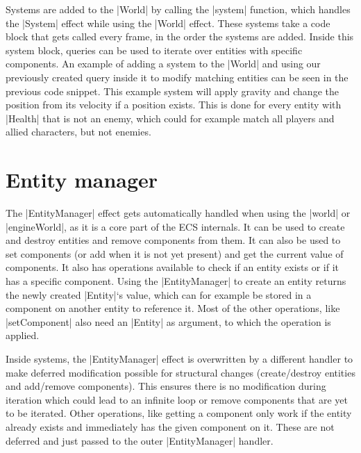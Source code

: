 Systems are added to the |World| by calling the |system| function, which handles the |System| effect while using the |World| effect. These systems take a code block that gets called every frame, in the order the systems are added. Inside this system block, queries can be used to iterate over entities with specific components. An example of adding a system to the |World| and using our previously created query inside it to modify matching entities can be seen in the previous code snippet. This example system will apply gravity and change the position from its velocity if a position exists. This is done for every entity with |Health| that is not an enemy, which could for example match all players and allied characters, but not enemies.

\section{Entity manager}

The |EntityManager| effect gets automatically handled when using the |world| or |engineWorld|, as it is a core part of the ECS internals. It can be used to create and destroy entities and remove components from them. It can also be used to set components (or add when it is not yet present) and get the current value of components. It also has operations available to check if an entity exists or if it has a specific component. Using the |EntityManager| to create an entity returns the newly created |Entity|`s value, which can for example be stored in a component on another entity to reference it. Most of the other operations, like |setComponent| also need an |Entity| as argument, to which the operation is applied.

Inside systems, the |EntityManager| effect is overwritten by a different handler to make deferred modification possible for structural changes (create/destroy entities and add/remove components). This ensures there is no modification during iteration which could lead to an infinite loop or remove components that are yet to be iterated. Other operations, like getting a component only work if the entity already exists and immediately has the given component on it. These are not deferred and just passed to the outer |EntityManager| handler.
